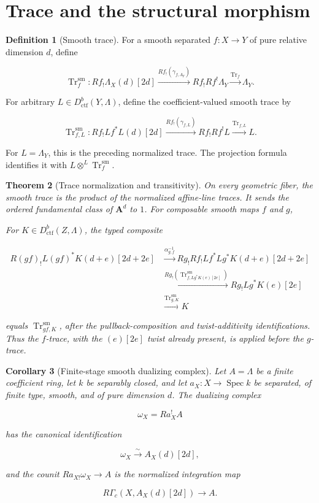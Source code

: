 \documentclass[10pt]{article}
\newtheorem{theorem}{Theorem}[section]
\newtheorem{corollary}[theorem]{Corollary}
\theoremstyle{definition}
\newtheorem{definition}[theorem]{Definition}
\newcommand{\Dctf}{D^b_{\mathrm{ctf}}}
\newcommand{\Tr}{\operatorname{Tr}}
\begin{document}
\section{Trace and the structural morphism}

\begin{definition}[Smooth trace]
For a smooth separated \(f:X\to Y\) of pure relative dimension \(d\), define

\[
 \Tr_f^{\mathrm{sm}}:
 Rf_!\Lambda_X(d)[2d]
 \xrightarrow{Rf_!(\gamma_{f,\Lambda_Y})}
 Rf_!Rf^!\Lambda_Y
 \xrightarrow{\Tr_f}\Lambda_Y.
\]

For arbitrary \(L\in\Dctf(Y,\Lambda)\), define the coefficient-valued smooth
trace by

\[
 \Tr^{\mathrm{sm}}_{f,L}:
 Rf_!Lf^*L(d)[2d]
 \xrightarrow{Rf_!(\gamma_{f,L})}
 Rf_!Rf^!L
 \xrightarrow{\Tr_{f,L}}L.
\]

For \(L=\Lambda_Y\), this is the preceding normalized trace.  The projection
formula identifies it with
\(L\otimes^L\Tr_f^{\mathrm{sm}}\).
\end{definition}

\begin{theorem}[Trace normalization and transitivity]
On every geometric fiber, the smooth trace is the product of the normalized
affine-line traces.  It sends the ordered fundamental class of
\(\mathbf A^d\) to \(1\).  For composable smooth maps \(f\) and \(g\),

For \(K\in\Dctf(Z,\Lambda)\), the typed composite

\[
\begin{aligned}
R(gf)_!L(gf)^*K(d+e)[2d+2e]
&\xrightarrow{\alpha_{g,f}^{-1}}
Rg_!Rf_!Lf^*Lg^*K(d+e)[2d+2e]\\
&\xrightarrow{Rg_!(\Tr^{\mathrm{sm}}_{f,Lg^*K(e)[2e]})}
Rg_!Lg^*K(e)[2e]\\
&\xrightarrow{\Tr^{\mathrm{sm}}_{g,K}}K
\end{aligned}
\]

equals \(\Tr^{\mathrm{sm}}_{gf,K}\), after the pullback-composition and
twist-additivity identifications.  Thus the \(f\)-trace, with the
\((e)[2e]\) twist already present, is applied before the \(g\)-trace.
\end{theorem}

\begin{corollary}[Finite-stage smooth dualizing complex]
Let \(A=\Lambda\) be a finite coefficient ring, let \(k\) be separably
closed, and let \(a_X:X\to\operatorname{Spec}k\) be separated, of finite
type, smooth, and of pure dimension \(d\).  The dualizing complex

\[
 \omega_X=Ra_X^!A
\]

has the canonical identification

\[
 \omega_X\xrightarrow{\sim}A_X(d)[2d],
\]

and the counit \(Ra_{X!}\omega_X\to A\) is the normalized integration map

\[
 R\Gamma_c(X,A_X(d)[2d])\longrightarrow A.
\]
\end{corollary}
\end{document}
